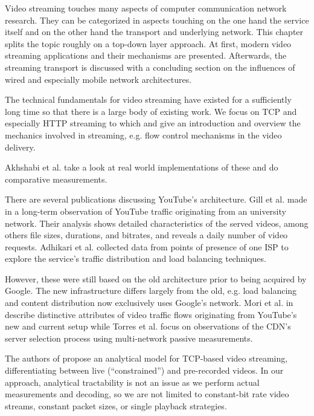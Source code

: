 Video streaming touches many aspects of computer communication network research. They can be categorized in aspects touching on the one hand the service itself and on the other hand  the transport and underlying network. This chapter splits the topic roughly on a top-down layer approach. At first, modern video streaming applications and their mechanisms are presented. Afterwards, the streaming transport is discussed with a concluding section on the influences of wired and especially mobile network architectures.


The technical fundamentals for video streaming have existed for a sufficiently long time so that there is a large body of existing work. We focus on TCP and especially HTTP streaming to which \cite{watching-video1} and \cite{ma2011mobile} give an introduction and overview the mechanics involved in streaming, e.g. flow control mechanisms in the video delivery.

Akhshabi et al. \cite{akhshabi2011experimental} take a look at real world implementations of these and do comparative measurements.

There are several publications discussing YouTube's architecture. Gill et al. made in \cite{gill2007youtube} a long-term observation of YouTube traffic originating from an university network. Their analysis shows detailed characteristics of the served videos, among others file sizes, durations, and bitrates, and reveals a daily number of video requests. Adhikari et al. \cite{adhikari2010youtube} collected data from points of presence of one ISP to explore the service's traffic distribution and load balancing techniques.

However, these were still based on the old architecture prior to being acquired by Google. The new infrastructure differs largely from the old, e.g. load balancing and content distribution now exclusively uses Google’s network. Mori et al. in \cite{mori2010characterizing} describe distinctive attributes of video traffic flows originating from YouTube's new and current setup while Torres et al. \cite{torres2011dissecting} focus on observations of the CDN's server selection process using multi-network passive measurements.


The authors of \cite{wang2003model} propose an analytical model for TCP-based video streaming, differentiating between live (``constrained'') and pre-recorded videos. In our approach, analytical tractability is not an issue as we perform actual measurements and decoding, so we are not limited to constant-bit rate video streams, constant packet sizes, or single playback strategies.

